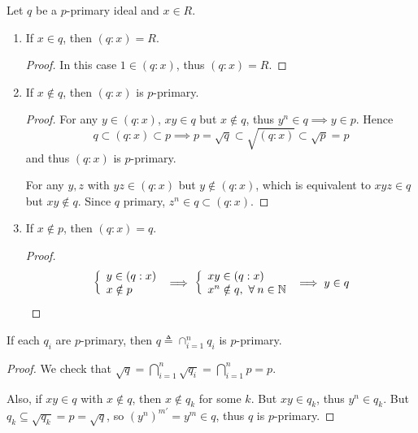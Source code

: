 \begin{prop} \label{prop:primary-divide-by-element}
  Let $q$ be a $p$-primary ideal and $x \in R$.
  \begin{enumerate}
    \item If $x \in q$, then $(q: x) = R$.
      \begin{proof}
        In this case $1 \in (q: x)$, thus $(q: x) = R$.
      \end{proof}
    \item If $x \notin q$, then $(q: x)$ is $p$-primary.
      \begin{proof}
        For any $y \in (q: x)$, $xy \in q$ but $x \notin q$, thus $y^n \in q \implies y \in p$.
        Hence
        \[ q \subset (q: x) \subset p \implies p = \sqrt{q} \subset \sqrt{(q: x)} \subset \sqrt{p} = p \]
        and thus $(q: x)$ is $p$-primary.

        For any $y, z$ with $yz \in (q: x)$ but $y \notin (q: x)$, which is equivalent
        to $xyz \in q$ but $xy \notin q$. Since $q$ primary, $z^n \in q \subset (q: x)$.
      \end{proof}
    \item If $x \notin p$, then $(q: x) = q$.
      \begin{proof}
        \[
          \left\{ \begin{array}{l}
            y \in (q: x) \\
            x \notin p \\
          \end{array} \right. \implies
          \left\{ \begin{array}{l}
            xy \in (q: x) \\
            x^n \notin q, \ \forall n \in \Nb \\
          \end{array} \right. \implies y \in q
          \qedhere
        \]
      \end{proof}
  \end{enumerate}
\end{prop}

\begin{prop}  \label{prop:intersection-of-primary-is-primary}
  If each $q_i$ are $p$-primary, then $q \triangleq \cap_{i = 1}^n q_i$ is $p$-primary.

  \begin{proof}
    We check that $\sqrt{q} = \bigcap_{i = 1}^n \sqrt{q_i} = \bigcap_{i = 1}^n p = p$.

    Also, if $xy \in q$ with $x \notin q$, then $x \notin q_k$ for some $k$.
    But $xy \in q_k$, thus $y^n \in q_k$.
    But $q_k \subseteq \sqrt{q_k} = p = \sqrt{q}$, so $(y^n)^{m'} = y^m \in q$, 
    thus $q$ is $p$-primary.
  \end{proof}
\end{prop}

